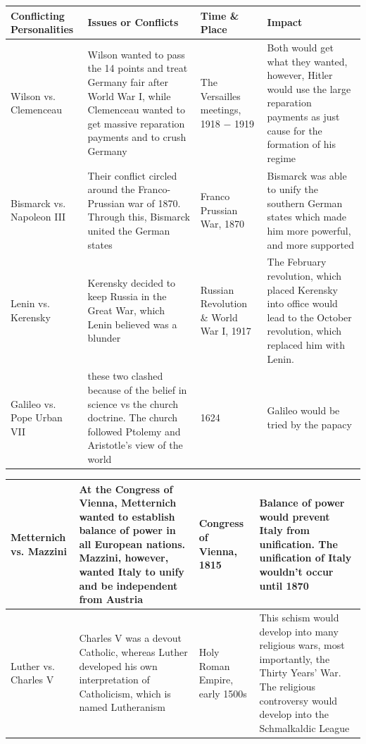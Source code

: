 \documentclass[12pt]{article}
\begin{document}
\begin{enumerate}
\hspace{-25pt} \begin{tabular}{|p{}|p{}|p{}|p{}|}
\hline
Conflicting Personalities & Issues or Conflicts & Time \& Place & Impact \\
\hline
Wilson vs. Clemenceau & Wilson wanted to pass the 14 points and treat Germany fair after World War I, while Clemenceau wanted to get massive reparation payments and to crush Germany & The Versailles meetings, 1918 $-$ 1919  & Both would get what they wanted, however, Hitler would use the large reparation payments as just cause for the formation of his regime  \\
\hline
Bismarck vs. Napoleon III & Their conflict circled around the Franco-Prussian war of 1870. Through this, Bismarck united the German states  & Franco Prussian War, 1870  & Bismarck was able to unify the southern German states which made him more powerful, and more supported  \\
\hline
Lenin vs. Kerensky & Kerensky decided to keep Russia in the Great War, which Lenin believed was a blunder & Russian Revolution \& World War I, 1917  & The February revolution, which placed Kerensky into office would lead to the October revolution, which replaced him with Lenin.  \\
\hline
Galileo vs. Pope Urban VII  & these two clashed because of the belief in science vs the church doctrine. The church followed Ptolemy and Aristotle's view of the world & 1624 & Galileo would be tried by the papacy  \\
\hline
\end{tabular}
\newpage
\hspace{-25pt} \begin{tabular}{|p{}|p{}|p{}|p{}|}
\hline
Metternich vs. Mazzini & At the Congress of Vienna, Metternich wanted to establish balance of power in all European nations. Mazzini, however, wanted Italy to unify and be independent from Austria  & Congress of Vienna, 1815 & Balance of power would prevent Italy from unification. The unification of Italy wouldn't occur until 1870  \\
\hline
Luther vs. Charles V & Charles V was a devout Catholic, whereas Luther developed his own interpretation of Catholicism, which is named Lutheranism  & Holy Roman Empire, early 1500s  & This schism would develop into many religious wars, most importantly, the Thirty Years' War. The religious controversy would develop into the Schmalkaldic League  \\

\end{tabular}
\end{enumerate}
\end{document}
